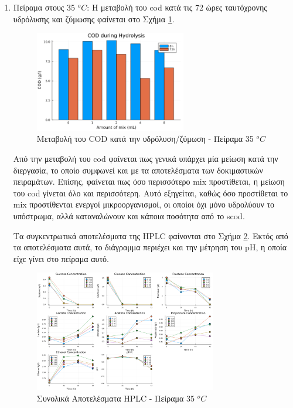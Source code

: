 \documentclass[11pt]{report}
\begin{document}
\begin{enumerate}
\item Πείραμα στους 35 \(^oC\):
\label{sec:orgaffa87f}
Η μεταβολή του \acrshort{cod} κατά τις 72 ώρες ταυτόχρονης υδρόλυσης και ζύμωσης φαίνεται στο Σχήμα \ref{fig:org627906c}.

\begin{figure}[htbp]
\centering
\includegraphics[width=250px]{../plots/10_11/cod_groupedbar_10_11.png}
\caption{\label{fig:org627906c}Μεταβολή του COD κατά την υδρόλυση/ζύμωση - Πείραμα 35 \(^oC\)}
\end{figure}

Από την μεταβολή του \acrshort{cod} φαίνεται πως γενικά υπάρχει μία μείωση κατά την διεργασία, το οποίο συμφωνεί και με τα αποτελέσματα των δοκιμαστικών πειραμάτων. Επίσης, φαίνεται πως όσο περισσότερο \acrshort{mix} προστίθεται, η μείωση του \acrshort{cod} γίνεται όλο και περισσότερη. Αυτό εξηγείται, καθώς όσο προστίθεται το \acrshort{mix} προστίθενται ενεργοί μικροοργανισμοί, οι οποίοι όχι μόνο υδρολύουν το υπόστρωμα, αλλά καταναλώνουν και κάποια ποσότητα από το \acrfull{scod}.

Τα συγκεντρωτικά αποτελέσματα της HPLC φαίνονται στο Σχήμα \ref{fig:orgdba433c}. Εκτός από τα αποτελέσματα αυτά, το διάγραμμα περιέχει και την μέτρηση του pH, η οποία είχε γίνει στο πείραμα αυτό.

\begin{figure}[htbp]
\centering
\includegraphics[width=300px]{../plots/10_11/final_scatter_10_11.png}
\caption{\label{fig:orgdba433c}Συνολικά Αποτελέσματα HPLC - Πείραμα 35 \(^oC\)}
\end{figure}


\end{enumerate}
\end{document}
